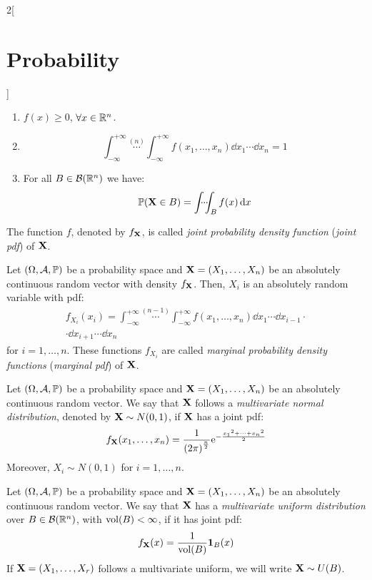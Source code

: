 \documentclass[../../../main.tex]{subfiles}
\begin{document}
\begin{multicols}{2}[\section{Probability}]
\begin{definition}
    \begin{enumerate}
      \item $f(x)\geq 0$, $\forall x\in\mathbb{R}^n$.
      \item \hfill $$\int_{-\infty}^{+\infty}\overset{(n)}{\cdots}\int_{-\infty}^{+\infty} f(x_1,\ldots,x_n)\dd{x_1}\cdots\dd{x_n}=1$$
      \item For all $B\in\mathcal{B}(\mathbb{R}^n)$ we have: $$\Prob(\vf{X}\in B)=\dotsint_Bf(x)\dd{x}$$
    \end{enumerate}
    The function $f$, denoted by $f_{\boldsymbol{\mathrm{X}}}$, is called \emph{joint probability density function} (\emph{joint pdf}) of $\boldsymbol{\mathrm{X}}$.
  \end{definition}
  \begin{proposition}
    Let $(\Omega,\mathcal{A},\mathbb{P})$ be a probability space and $\boldsymbol{\mathrm{X}}=(X_1,\ldots,X_n)$ be an absolutely continuous random vector with density $f_{\boldsymbol{\mathrm{X}}}$. Then, $X_i$ is an absolutely random variable with pdf:
    \begin{multline*}
      f_{X_i}(x_i)=\int_{-\infty}^{+\infty}\overset{(n-1)}{\cdots}\int_{-\infty}^{+\infty} f(x_1,\ldots,x_n)\dd{x_1}\cdots\dd{x_{i-1}}\cdot\\\cdot\dd{x_{i+1}}\cdots\dd{x_n}
    \end{multline*}
    for $i=1,\ldots, n$. These functions $f_{X_i}$ are called \emph{marginal probability density functions} (\emph{marginal pdf}) of $\boldsymbol{\mathrm{X}}$.
  \end{proposition}
  \begin{definition}
    Let $(\Omega,\mathcal{A},\mathbb{P})$ be a probability space and $\boldsymbol{\mathrm{X}}=(X_1,\ldots,X_n)$ be an absolutely continuous random vector. We say that $\boldsymbol{\mathrm{X}}$ follows a \emph{multivariate normal distribution}, denoted by $\boldsymbol{\mathrm{X}}\sim N(0,1)$, if $\boldsymbol{\mathrm{X}}$ has a joint pdf: $$f_{\boldsymbol{\mathrm{X}}}(x_1,\ldots,x_n)=\frac{1}{{(2\pi)}^{\frac{n}{2}}}\mathrm{e}^{-\frac{{x_1}^2+\cdots+{x_n}^2}{2}}$$ Moreover, $X_i\sim N(0,1)$ for $i=1,\ldots,n$.
  \end{definition}
  \begin{definition}
    Let $(\Omega,\mathcal{A},\mathbb{P})$ be a probability space and $\boldsymbol{\mathrm{X}}=(X_1,\ldots,X_n)$ be an absolutely continuous random vector. We say that $\boldsymbol{\mathrm{X}}$ has a \emph{multivariate uniform distribution} over $B\in\mathcal{B}(\mathbb{R}^n)$, with $\operatorname{vol}(B)<\infty$, if it has joint pdf: $$f_{\boldsymbol{\mathrm{X}}}(x)=\frac{1}{\operatorname{vol}(B)}\boldsymbol{\mathrm{1}}_B(x)$$ If $\boldsymbol{\mathrm{X}}=(X_1,\ldots,X_r)$ follows a multivariate uniform, we will write $\boldsymbol{\mathrm{X}}\sim U(B)$.

\end{definition}
\end{multicols}
\end{document}
